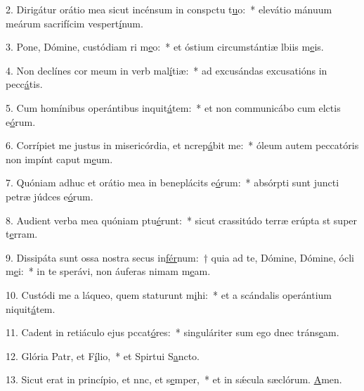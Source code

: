 2. Dirigátur orátio mea sicut incénsum in conspctu t\uline{u}o:~* elevátio mánuum meárum sacrifícim vespert\uline{í}num.\par 
3. Pone, Dómine, custódiam ri m\uline{e}o:~* et óstium circumstántiæ lbiis m\uline{e}is.\par 
4. Non declínes cor meum in verb mal\uline{í}tiæ:~* ad excusándas excusatións in pecc\uline{á}tis.\par 
5. Cum homínibus operántibus inquit\uline{á}tem:~* et non communicábo cum elctis e\uline{ó}rum.\par 
6. Corrípiet me justus in misericórdia, et ncrep\uline{á}bit me:~* óleum autem peccatóris non impínt caput m\uline{e}um.\par 
7. Quóniam adhuc et orátio mea in beneplácits e\uline{ó}rum:~* absórpti sunt juncti petræ júdces e\uline{ó}rum.\par 
8. Audient verba mea quóniam ptu\uline{é}runt:~* sicut crassitúdo terræ erúpta st super t\uline{e}rram.\par 
9. Dissipáta sunt ossa nostra secus in\uline{fér}num:~† quia ad te, Dómine, Dómine, ócli m\uline{e}i:~* in te sperávi, non áuferas nimam m\uline{e}am.\par 
10. Custódi me a láqueo, quem staturunt m\uline{i}hi:~* et a scándalis operántium niquit\uline{á}tem.\par 
11. Cadent in retiáculo ejus pccat\uline{ó}res:~* singuláriter sum ego dnec tráns\uline{e}am.\par 
12. Glória Patr, et F\uline{í}lio,~* et Spirtui S\uline{a}ncto.\par 
13. Sicut erat in princípio, et nnc, et s\uline{e}mper,~* et in sǽcula sæclórum. \uline{A}men.\par 
